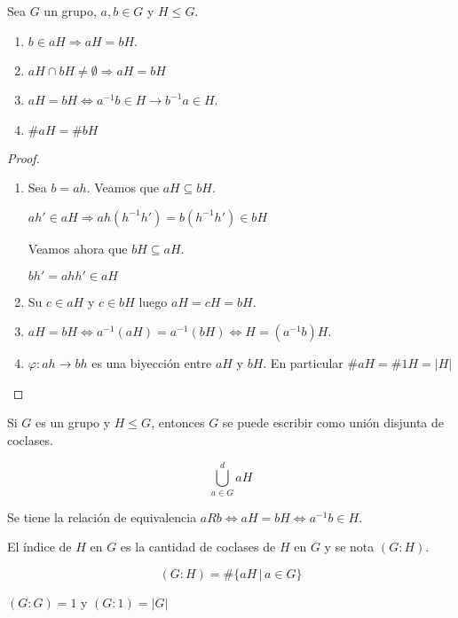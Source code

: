 \begin{obs}
Sea $G$ un grupo, $a,b \in G$ y $H \leq G$.

\begin{enumerate}
\item $b \in aH \Rightarrow aH = bH$.
\item $aH \cap bH \neq \emptyset \Rightarrow aH = bH$
\item $aH = bH \Leftrightarrow a^{-1}b \in H \rightarrow b^{-1}a \in H$.
\item $\#aH = \#bH$
\end{enumerate}
\end{obs}

\begin{proof}
$ $

\begin{enumerate}
\item Sea $b = ah$. Veamos que $aH \subseteq bH$.

$ah' \in aH \Rightarrow ah(h^{-1}h') = b(h^{-1}h') \in bH$

Veamos ahora que $bH \subseteq aH$.

$bh' = ahh' \in aH$
\item Su $c \in aH$ y $c \in bH$ luego $aH = cH = bH$.
\item $aH = bH \Leftrightarrow  a^{-1}(aH) = a^{-1}(bH) \Leftrightarrow H = (a^{-1}b)H$.
\item $\varphi: ah \rightarrow bh$ es una biyecci\'on entre $aH$ y $bH$. En particular $\#aH = \#1H = |H|$
\end{enumerate}
\end{proof}

\begin{obs}
Si $G$ es un grupo y $H \leq G$, entonces $G$ se puede escribir como uni\'on disjunta de coclases.

$$\displaystyle \bigcup_{a \in G}^{d} aH$$
\end{obs}

\begin{obs}
Se tiene la relaci\'on de equivalencia $aRb \Leftrightarrow aH = bH \Leftrightarrow a^{-1}b \in H$.
\end{obs}

\begin{defn}
El \'indice de $H$ en $G$ es la cantidad de coclases de $H$ en $G$ y se nota $(G : H)$.

$$(G : H) = \#\{aH \, | \, a \in G\}$$
\end{defn}

\begin{obs}
$(G : G) = 1$ y $(G : 1) = |G|$
\end{obs}

